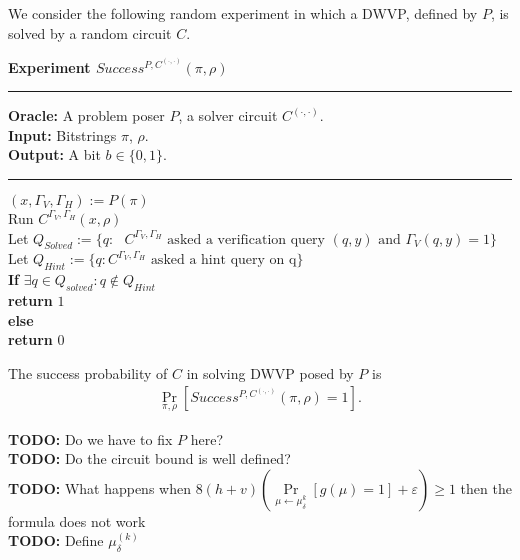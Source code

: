 %
We consider the following random experiment in which a DWVP, defined by $P$, is solved by a random circuit $C$.
\begin{codeblock}
  \textbf{Experiment $Success^{P, C^{(\cdot, \cdot)}}(\pi, \rho) $}
  \medskip
  \hrule
  \medskip
  \textbf{Oracle:} A problem poser $P$, a solver circuit $C^{(\cdot,\cdot)}$.\\
  \textbf{Input:}  Bitstrings $\pi$, $\rho$.\\
  \textbf{Output:} A bit $b \in \{0,1\}$.
  \medskip\hrule\medskip
  $(x, \Gamma_V, \Gamma_H) := P(\pi)$ \\
  Run $C^{\Gamma_V,\Gamma_H}(x, \rho)$ \\
  \IndI Let $Q_{Solved} := \{q: \text{ $C^{\Gamma_V, \Gamma_H}$ asked a verification query $(q,y)$ and $\Gamma_V(q, y) = 1$} \}$\\
  \IndI Let $Q_{Hint} := \{q: \text{$C^{\Gamma_V, \Gamma_H}$ asked a hint query on q} \}$\\
  \textbf{If} $\exists q \in Q_{solved} : q \notin Q_{Hint}$ \then \\
  \IndI \textbf{return} $1$\\
  \textbf{else} \\
  \IndI \textbf{return} $0$\\
\end{codeblock}
%
The success probability of $C$ in solving DWVP posed by $P$ is
\begin{align}
 \underset{\pi, \rho}{\Pr}[Success^{P,C^{(\cdot, \cdot)}}(\pi, \rho) = 1].
\end{align}
%
\begin{todo}
  \textbf{TODO:} Do we have to fix $P$ here?\\
  \textbf{TODO:} Do the circuit bound is well defined?\\
  \textbf{TODO:} What happens when $8(h+v) \left(\underset{\mu \leftarrow \mu_\delta^k}{\Pr}[g(\mu) = 1] + \varepsilon\right) \geq 1$ then the formula does not work\\
  \textbf{TODO:} Define $\mu_{\delta}^{(k)}$ \\
\end{todo}
%
